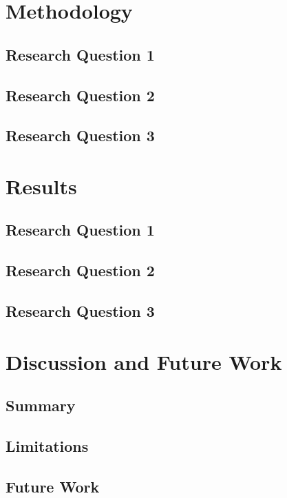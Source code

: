 \documentclass[12pt]{scrartcl}
\begin{document}
\section{Methodology}
\subsection{Research Question 1}
\subsection{Research Question 2}
\subsection{Research Question 3}

\section{Results}
\subsection{Research Question 1}
\subsection{Research Question 2}
\subsection{Research Question 3}

\section{Discussion and Future Work}
\subsection{Summary}
\subsection{Limitations}
\subsection{Future Work}
\printbibliography
\end{document}
